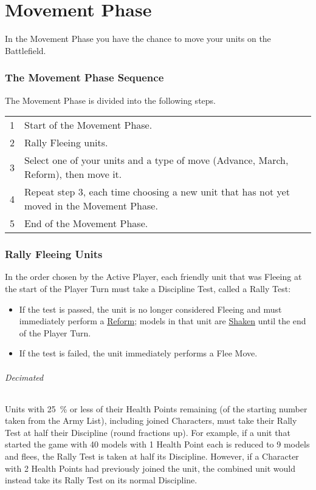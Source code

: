 
\part{Movement Phase}
\label{movement_phase}

In the Movement Phase you have the chance to move your units on the Battlefield.

\section{The Movement Phase Sequence}
\label{the_movement_phase_sequence}

The Movement Phase is divided into the following steps.

\hspace*{0.3cm}
\begin{tabular}{c|l}
1 & Start of the Movement Phase. \tabularnewline
2 & Rally Fleeing units. \tabularnewline
3 & Select one of your units and a type of move (Advance, March, Reform), then move it. \tabularnewline
4 & Repeat step 3, each time choosing a new unit that has not yet moved in the Movement Phase. \tabularnewline
5 & End of the Movement Phase. \tabularnewline
\end{tabular}

\section{Rally Fleeing Units}
\label{rally_fleeing_units}

In the order chosen by the Active Player, each friendly unit that was Fleeing at the start of the Player Turn must take a Discipline Test, called a Rally Test:
\begin{itemize}[label={-}]
\item If the test is passed, the unit is no longer considered Fleeing and must immediately perform a \hyperref[reform]{Reform}; models in that unit are \hyperref[shaken]{Shaken} until the end of the Player Turn.
\item If the test is failed, the unit immediately performs a Flee Move.
\end{itemize}

\paragraph{Decimated}

Units with \SI{25}{\percent} or less of their Health Points remaining (of the starting number taken from the Army List), including joined Characters, must take their Rally Test at half their Discipline (round fractions up). For example, if a unit that started the game with 40 models with 1 Health Point each is reduced to 9 models and flees, the Rally Test is taken at half its Discipline. However, if a Character with 2 Health Points had previously joined the unit, the combined unit would instead take its Rally Test on its normal Discipline.

